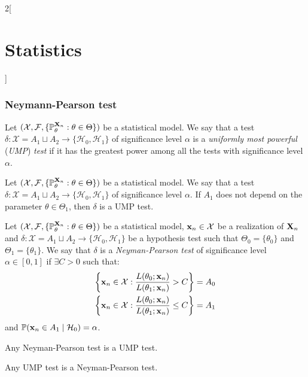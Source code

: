 \documentclass[../../../main.tex]{subfiles}
\begin{document}
\begin{multicols}{2}[\section{Statistics}]
  \subsubsection{Neymann-Pearson test}
  \begin{definition}
    Let $(\mathcal{X},\mathcal{F},\{\mathbb{P}_\theta^{\boldsymbol{\mathrm{X}}_n}:\theta\in\Theta\})$ be a statistical model. We say that a test $\delta:\mathcal{X}=A_1\sqcup A_2\rightarrow\{\mathcal{H}_0,\mathcal{H}_1\}$ of significance level $\alpha$ is a \emph{uniformly most powerful} (\emph{UMP}) \emph{test} if it has the greatest power among all the tests with significance level $\alpha$.
  \end{definition}
  \begin{lemma}
    Let $(\mathcal{X},\mathcal{F},\{\mathbb{P}_\theta^{\boldsymbol{\mathrm{X}}_n}:\theta\in\Theta\})$ be a statistical model. We say that a test $\delta:\mathcal{X}=A_1\sqcup A_2\rightarrow\{\mathcal{H}_0,\mathcal{H}_1\}$ of significance level $\alpha$. If $A_1$ does not depend on the parameter $\theta\in\Theta_1$, then $\delta$ is a UMP test.
  \end{lemma}
  \begin{definition}
    Let $(\mathcal{X},\mathcal{F},\{\mathbb{P}_\theta^{\boldsymbol{\mathrm{X}}_n}:\theta\in\Theta\})$ be a statistical model, $\boldsymbol{\mathrm{x}}_n\in\mathcal{X}$ be a realization of $\boldsymbol{\mathrm{X}}_n$ and $\delta:\mathcal{X}=A_1\sqcup A_2\rightarrow\{\mathcal{H}_0,\mathcal{H}_1\}$ be a hypothesis test such that $\Theta_0=\{\theta_0\}$ and $\Theta_1=\{\theta_1\}$. We say that $\delta$ is a \emph{Neyman-Pearson test} of significance level $\alpha\in[0,1]$ if $\exists C>0$ such that:
    \begin{gather*}
      \left\{\boldsymbol{\mathrm{x}}_n\in\mathcal{X}:\frac{L(\theta_0;\boldsymbol{\mathrm{x}}_n)}{L(\theta_1;\boldsymbol{\mathrm{x}}_n)}> C\right\}= A_0\\
      \left\{\boldsymbol{\mathrm{x}}_n\in\mathcal{X}:\frac{L(\theta_0;\boldsymbol{\mathrm{x}}_n)}{L(\theta_1;\boldsymbol{\mathrm{x}}_n)}\leq C\right\}= A_1
    \end{gather*}
    and $\mathbb{P}(\boldsymbol{\mathrm{x}}_n\in A_1\mid \mathcal{H}_0)=\alpha$.
  \end{definition}
  \begin{lemma}
    Any Neyman-Pearson test is a UMP test.
  \end{lemma}
  \begin{theorem}
    Any UMP test is a Neyman-Pearson test.
  \end{theorem}

\end{multicols}
\end{document}
